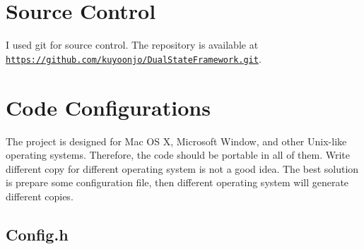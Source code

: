 \hypertarget{_start_development_StartDevelopmentSourceControl}{}\section{Source Control}\label{_start_development_StartDevelopmentSourceControl}
I used git for source control. The repository is available at \href{https://github.com/kuyoonjo/DualStateFramework.git}{\tt https\+://github.\+com/kuyoonjo/\+Dual\+State\+Framework.\+git}. \hypertarget{_start_development_StartDevelopmentCodeConfigurations}{}\section{Code Configurations}\label{_start_development_StartDevelopmentCodeConfigurations}
The project is designed for Mac O\+S X, Microsoft Window, and other Unix-\/like operating systems. Therefore, the code should be portable in all of them. Write different copy for different operating system is not a good idea. The best solution is prepare some configuration file, then different operating system will generate different copies. \hypertarget{_start_development_StartDevelopmentCodeConfigurationsConfig_h}{}\subsection{Config.\+h}\label{_start_development_StartDevelopmentCodeConfigurationsConfig_h}

